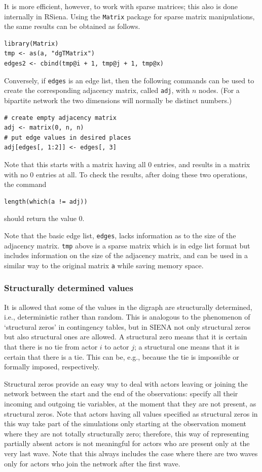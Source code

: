 \documentclass[a4paper,fleqn,11pt]{article}
\newcommand{\+}{\, + \,}
\newcommand{\rs}{{\sf RSiena}}
\newcommand{\SI}{{\sf SIENA }}
\begin{document}
{It is more efficient, however, to work with sparse matrices;
this also is done internally in \rs.
Using the \texttt{Matrix} package for sparse matrix manipulations,
the same results can be obtained as follows.
\begin{verbatim}
library(Matrix)
tmp <- as(a, "dgTMatrix")
edges2 <- cbind(tmp@i + 1, tmp@j + 1, tmp@x)
\end{verbatim}
Conversely, if \texttt{edges} is an edge list, then the following commands
can be used to create the corresponding
adjacency matrix, called \texttt{adj},
with $n$ nodes. (For a bipartite network the two dimensions
will normally be distinct numbers.)
\begin{verbatim}
# create empty adjacency matrix
adj <- matrix(0, n, n)
# put edge values in desired places
adj[edges[, 1:2]] <- edges[, 3]
\end{verbatim}
Note that this starts with a matrix having all 0 entries,
and results in a matrix with no 0 entries at all.
To check the results, after doing these two operations, the command
\begin{verbatim}
length(which(a != adj))
\end{verbatim}
should return the value 0.

Note that the basic edge list, \verb|edges|, lacks information as to the size of
the adjacency matrix. \verb|tmp| above is a sparse matrix which is in edge list
format but includes information on the size of the adjacency matrix, and can be
used in a similar way to the original matrix \verb|a| while saving memory space.

\subsubsection{Structurally determined values}
\label{S_struct}

It is allowed that some of the values in the digraph are
structurally determined, i.e., deterministic rather than random.
This is analogous to the phenomenon of `structural zeros' in
contingency tables, but in \SI not only structural zeros but also
structural ones are allowed. A structural zero means that it is
certain that there is no tie from actor $i$ to actor $j$; a
structural one means that it is certain that there is a tie. This
can be, e.g., because the tie is impossible or formally imposed,
respectively.

Structural zeros provide an easy way to deal with actors leaving
or joining the network between the start and the end
of the observations: specify all their incoming and outgoing tie
variables, at the moment that they are not present, as structural zeros.
Note that actors having all values specified as structural zeros in this way
take part of the simulations only starting at the observation moment
where they are not totally structurally zero;
therefore, this way of representing partially absent actors
is not meaningful for actors who are present only at the very last wave.
Note that this always includes the case where there are two waves only
for actors who join the network after the first wave.

}
\end{document}

